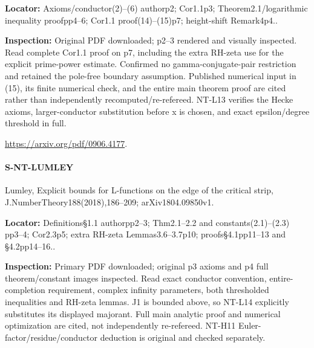 \documentclass[11pt,a4paper]{article}
\begin{document}
\textbf{Locator:} Axioms/\allowbreak{}conductor(2)–\allowbreak{}(6) authorp2; Cor1.\allowbreak{}1p3; Theorem2.\allowbreak{}1/\allowbreak{}logarithmic inequality proofpp4–\allowbreak{}6; Cor1.\allowbreak{}1 proof(14)–\allowbreak{}(15)p7; height-shift Remark4p4.\allowbreak{}.

\textbf{Inspection:} Original PDF downloaded; p2–\allowbreak{}3 rendered and visually inspected.\allowbreak{} Read complete Cor1.\allowbreak{}1 proof on p7, including the extra RH-zeta use for the explicit prime-power estimate.\allowbreak{} Confirmed no gamma-conjugate-pair restriction and retained the pole-free boundary assumption.\allowbreak{} Published numerical input in (15), its finite numerical check, and the entire main theorem proof are cited rather than independently recomputed/\allowbreak{}re-refereed.\allowbreak{} NT-L13 verifies the Hecke axioms, larger-conductor substitution before x is chosen, and exact epsilon/\allowbreak{}degree threshold in full.\allowbreak{}

\url{https://arxiv.org/pdf/0906.4177}.

\paragraph{S-NT-LUMLEY} Lumley, Explicit bounds for L-functions on the edge of the critical strip, J.\allowbreak{}NumberTheory188(2018),186–\allowbreak{}209; arXiv1804.\allowbreak{}09850v1.

\textbf{Locator:} Definitions§1.\allowbreak{}1 authorpp2–\allowbreak{}3; Thm2.\allowbreak{}1–\allowbreak{}2.\allowbreak{}2 and constants(2.\allowbreak{}1)–\allowbreak{}(2.\allowbreak{}3) pp3–\allowbreak{}4; Cor2.\allowbreak{}3p5; extra RH-zeta Lemmas3.\allowbreak{}6–\allowbreak{}3.\allowbreak{}7p10; proofs§4.\allowbreak{}1pp11–\allowbreak{}13 and §4.\allowbreak{}2pp14–\allowbreak{}16.\allowbreak{}.

\textbf{Inspection:} Primary PDF downloaded; original p3 axioms and p4 full theorem/\allowbreak{}constant images inspected.\allowbreak{} Read exact conductor convention, entire-completion requirement, complex infinity parameters, both thresholded inequalities and RH-zeta lemmas.\allowbreak{} J1 is bounded above, so NT-L14 explicitly substitutes its displayed majorant.\allowbreak{} Full main analytic proof and numerical optimization are cited, not independently re-refereed.\allowbreak{} NT-H11 Euler-factor/\allowbreak{}residue/\allowbreak{}conductor deduction is original and checked separately.\allowbreak{}
\end{document}
